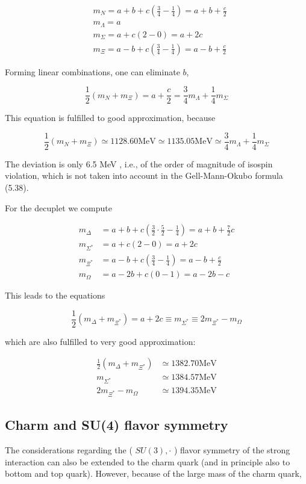 \documentclass[10pt, letterpaper]{article}
\begin{document}
$$
\begin{aligned}
& m_{N}=a+b+c\left(\frac{3}{4}-\frac{1}{4}\right)=a+b+\frac{c}{2} \\
& m_{\Lambda}=a \\
& m_{\Sigma}=a+c(2-0)=a+2 c \\
& m_{\Xi}=a-b+c\left(\frac{3}{4}-\frac{1}{4}\right)=a-b+\frac{c}{2}
\end{aligned}
$$

Forming linear combinations, one can eliminate $b$,

$$
\frac{1}{2}\left(m_{N}+m_{\Xi}\right)=a+\frac{c}{2}=\frac{3}{4} m_{\Lambda}+\frac{1}{4} m_{\Sigma}
$$

This equation is fulfilled to good approximation, because

$$
\frac{1}{2}\left(m_{N}+m_{\Xi}\right) \simeq 1128.60 \mathrm{MeV} \simeq 1135.05 \mathrm{MeV} \simeq \frac{3}{4} m_{\Lambda}+\frac{1}{4} m_{\Sigma}
$$

The deviation is only 6.5 MeV , i.e., of the order of magnitude of isospin violation, which is not taken into account in the Gell-Mann-Okubo formula (5.38).

For the decuplet we compute

$$
\begin{aligned}
m_{\Delta} & =a+b+c\left(\frac{3}{2} \cdot \frac{5}{2}-\frac{1}{4}\right)=a+b+\frac{7}{2} c \\
m_{\Sigma^{*}} & =a+c(2-0)=a+2 c \\
m_{\Xi^{*}} & =a-b+c\left(\frac{3}{4}-\frac{1}{4}\right)=a-b+\frac{c}{2} \\
m_{\Omega} & =a-2 b+c(0-1)=a-2 b-c
\end{aligned}
$$

This leads to the equations

$$
\frac{1}{2}\left(m_{\Delta}+m_{\Xi^{*}}\right)=a+2 c \equiv m_{\Sigma^{*}} \equiv 2 m_{\Xi^{*}}-m_{\Omega}
$$

which are also fulfilled to very good approximation:

$$
\begin{aligned}
\frac{1}{2}\left(m_{\Delta}+m_{\Xi^{*}}\right) & \simeq 1382.70 \mathrm{MeV} \\
m_{\Sigma^{*}} & \simeq 1384.57 \mathrm{MeV} \\
2 m_{\Xi^{*}}-m_{\Omega} & \simeq 1394.35 \mathrm{MeV}
\end{aligned}
$$

\subsection{Charm and SU(4) flavor symmetry}
The considerations regarding the ( $S U(3), \cdot$ ) flavor symmetry of the strong interaction can also be extended to the charm quark (and in principle also to bottom and top quark). However, because of the large mass of the charm quark,
\end{document}
